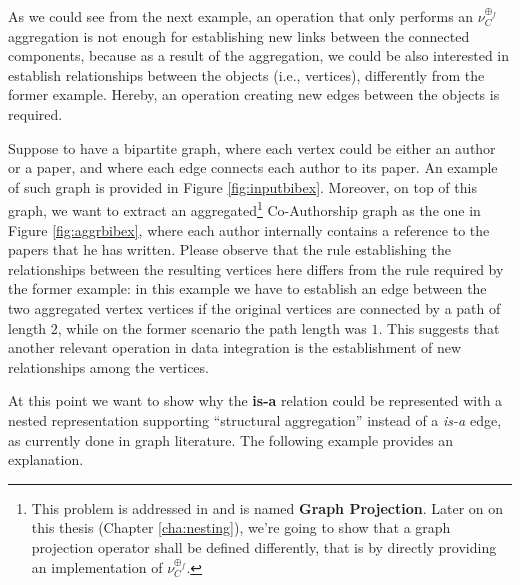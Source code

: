 As we could see from the next example, an operation that only performs an $\nu_C^{\oplus_f}$ aggregation is not enough for establishing new links between the connected components, because as a result of the aggregation, we could be also interested in establish  relationships between the objects (i.e., vertices),  differently from the former example. Hereby, an operation creating new edges between the objects is required.

\begin{example}\label{ex:bigraphbibnet}
Suppose to have a bipartite graph, where each vertex could be either an author or a paper, and where each edge connects each author to its paper. An example of such graph is provided in Figure \vref{fig:inputbibex}. Moreover, on top of this graph, we want to extract an aggregated\footnote{This problem is addressed in \cite{DMR} and is named \textbf{Graph Projection}. Later on on this thesis (Chapter \ref{cha:nesting}), we're going to show that a graph projection operator shall be defined differently, that is by directly providing an implementation of $\nu_C^{\oplus_f}$.} Co-Authorship graph as the one in Figure \ref{fig:aggrbibex}, where each author internally contains a reference to the papers that he has written. Please observe that the rule establishing the relationships between the resulting vertices here differs from the rule required by the former example: in this example we have to establish an edge between the two aggregated vertex vertices if the original vertices are connected by a path of length $2$, while on the former scenario the path length was $1$. This suggests that another relevant operation in data integration is the establishment of new relationships among the vertices.
\end{example}

At this point we want to show why the \textbf{is-a} relation could be represented with a nested representation supporting ``structural aggregation'' instead of a \textit{is-a} edge, as currently done in  graph literature. The following example provides an explanation.


